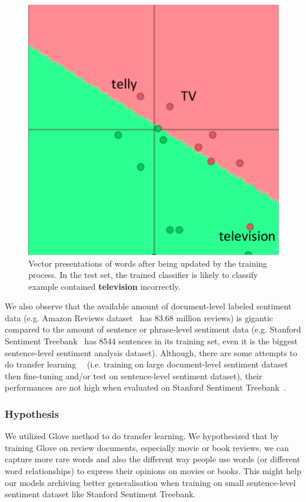 \begin{figure}[H]
    \centering
    \includegraphics[scale=0.31]{figure/vec-after-update}
    \caption[Word embeddings updating causing over-fitting 2]{Vector presentations of words after being updated by the training process.
    In the test set, the trained classifier is likely to classify example contained \textbf{television} incorrectly.}
    \label{fig:updating-word-bad-2}
\end{figure}

We also observe that the available amount of document-level labeled sentiment data (e.g. Amazon Reviews dataset~\cite{amazon-reviews} has 83.68 million reviews) is gigantic compared to the amount of sentence or phrase-level sentiment data (e.g. Stanford Sentiment Treebank~\cite{socher2013recursive} has 8544 sentences in its training set, even it is the biggest sentence-level sentiment analysis dataset).
Although, there are some attempts to do transfer learning~\cite{group-instance}~\cite{re-embedding} (i.e. training on large document-level sentiment dataset then fine-tuning and/or test on sentence-level sentiment dataset), their performances are not high when evaluated on Stanford Sentiment Treebank~\cite{group-instance}.

\subsubsection{Hypothesis}
We utilized Glove method to do transfer learning.
We hypothesized that by training Glove on review documents, especially movie or book reviews, we can capture more rare words and also the different way people use words (or different word relationships) to express their opinions on movies or books.
This might help our models archiving better generalisation when training on small sentence-level sentiment dataset like Stanford Sentiment Treebank.

